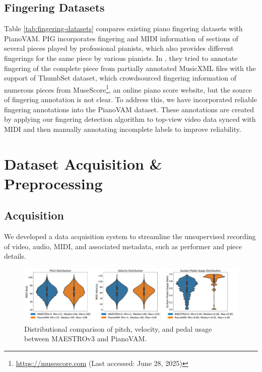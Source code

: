 \documentclass{article}
\begin{document}
\subsection{Fingering Datasets}
Table \ref{tab:fingering-datasets} compares existing piano fingering datasets with PianoVAM. PIG \cite{InfoSci20Nakamura} incorporates fingering and MIDI information of sections of several pieces played by professional pianists, which also provides different fingerings for the same piece by various pianists. In \cite{MM22Ramoneda}, they tried to annotate fingering of the complete piece from partially annotated MusicXML files with the support of ThumbSet dataset, which crowdsourced fingering information of numerous pieces from MuseScore\footnote{\href{https://musescore.com}{https://musescore.com} (Last accessed: June 28, 2025)}, an online piano score website, but the source of fingering annotation is not clear. To address this, we have incorporated reliable fingering annotations into the PianoVAM dataset. These annotations are created by applying our fingering detection algorithm to top-view video data synced with MIDI and then manually annotating incomplete labels to improve reliability. %


\section{Dataset Acquisition \& Preprocessing}\label{sec:dataset-acquisition-preprocessing}

\subsection{Acquisition}
We developed a data acquisition system to streamline the unsupervised recording of video, audio, MIDI, and associated metadata, such as performer and piece details.  
 
\begin{figure}
    \centering
    \includegraphics[width=1\linewidth]{Images/combined_violinplot.pdf}
    \vspace{-7mm}    
    \caption{Distributional comparison of pitch, velocity, and pedal usage between MAESTROv3 and PianoVAM.}
    \vspace{-3mm} 
    \label{fig:combined-violinplot}
\end{figure}
\end{document}

